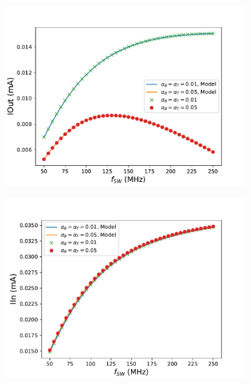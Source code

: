 	\begin{figure}
		\centering
		\begin{subfigure}{0.48\linewidth}
			\includegraphics[width=\linewidth]{4Terminal/Figures/IOUT_1.pdf}
		\end{subfigure}
		\begin{subfigure}{0.48\linewidth}
			\includegraphics[width=\linewidth]{4Terminal/Figures/IIN_1.pdf}
		\end{subfigure}
		\begin{subfigure}{0.48\linewidth}

\end{subfigure}
\end{figure}
